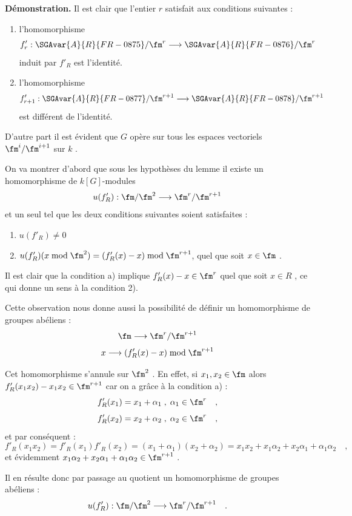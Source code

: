 \medskip

\noindent
\textbf{Démonstration.} Il est clair que l'entier $r$ satisfait aux conditions suivantes :
\begin{enumerate}
\item[a)] l'homomorphisme
\[
f'_r : \SGAvar{A}{R}{FR-0875}/\fm^r \longrightarrow \SGAvar{A}{R}{FR-0876}/\fm^r
\]
induit par $f'_R$ est l'identité.
\item[b)] l'homomorphisme
\[
f'_{r+1} : \SGAvar{A}{R}{FR-0877}/\fm^{r+1} \longrightarrow \SGAvar{A}{R}{FR-0878}/\fm^{r+1}
\]
est différent de l'identité.
\end{enumerate}

D'autre part il est évident que $G$ opère sur tous les espaces vectoriels $\fm^i/\fm^{i+1}$ sur $k$ .

On va montrer d'abord que sous les hypothèses du lemme il existe un homomorphisme de $k[G]$-modules
\[
u(f'_R) : \fm/\fm^2 \longrightarrow \fm^r/\fm^{r+1}
\]
et un seul tel que les deux conditions suivantes soient satisfaites :
\begin{enumerate}
\item[1)] $u(f'_R) \neq 0$
\item[2)] $u(f'_R)(x \bmod \fm^2) = (f'_R(x) - x) \bmod \fm^{r+1}$, quel que soit $x \in \fm$ .
\end{enumerate}

Il est clair que la condition a) implique $f'_R(x) - x \in \fm^r$ quel que soit $x \in R$ , ce qui donne un sens à la condition 2).

Cette observation nous donne aussi la possibilité de définir un homomorphisme de groupes abéliens :
\[
\fm \longrightarrow \fm^r/\fm^{r+1}
\]
\[
x \longrightarrow (f'_R(x) - x) \bmod \fm^{r+1}
\]

Cet homomorphisme s'annule sur $\fm^2$ . En effet, si $x_1, x_2 \in \fm$ alors $f'_R(x_1x_2) - x_1x_2 \in \fm^{r+1}$ car on a grâce à la condition a) :
\[
f'_R(x_1) = x_1 + \alpha_1 \; , \; \alpha_1 \in \fm^r \quad ,
\]
\[
f'_R(x_2) = x_2 + \alpha_2 \; , \; \alpha_2 \in \fm^r \quad ,
\]
et par conséquent :
\[
f'_R(x_1x_2) = f'_R(x_1)f'_R(x_2) = (x_1 + \alpha_1)(x_2 + \alpha_2) = x_1x_2 + x_1\alpha_2 + x_2\alpha_1 + \alpha_1\alpha_2 \quad ,
\]
et évidemment $x_1\alpha_2 + x_2\alpha_1 + \alpha_1\alpha_2 \in \fm^{r+1}$ .

Il en résulte donc par passage au quotient un homomorphisme de groupes abéliens :
\[
u(f'_R) : \fm/\fm^2 \longrightarrow \fm^r/\fm^{r+1} \quad .
\]

